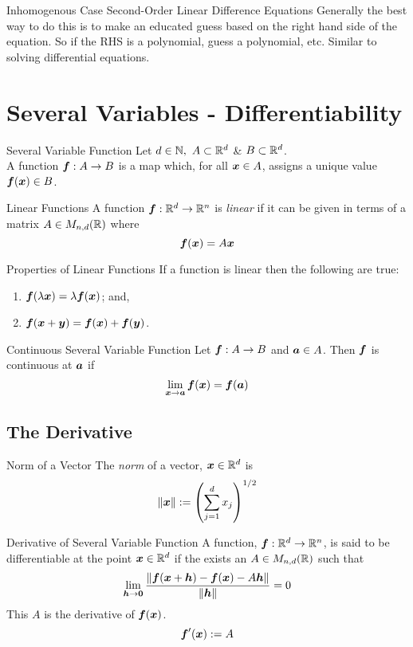 \documentclass[11pt,a4paper]{article}
\begin{document}
\subtitle{Remark 8.10 - }{Inhomogenous Case Second-Order Linear Difference Equations}
Generally the best way to do this is to make an educated guess based on the right hand side of the equation.
So if the RHS is a polynomial, guess a polynomial, etc. Similar to solving differential equations.

\section{Several Variables - Differentiability}
%
\subtitle{Definition 9.01 - }{Several Variable Function}
Let $d \in \mathbb{N},\ A \subset \mathbb{R}^d$ \& $B \subset \mathbb{R}^d$.\\
A function $\boldsymbol{f} : A \to B$ is a map which, for all $\boldsymbol{x} \in A$, assigns a unique value $\boldsymbol{f}(\boldsymbol{x}) \in B$.\\

\subtitle{Defintion 9.02 - }{Linear Functions}
A function $\boldsymbol{f} : \mathbb{R}^d \to \mathbb{R}^n$ is \textit{linear} if it can be given in terms of a matrix $A \in M_{n,d}(\mathbb{R})$ where
$$\boldsymbol{f}(\boldsymbol{x}) = A\boldsymbol{x}$$

\subtitle{Theorem 9.03 - }{Properties of Linear Functions}
If a function is linear then the following are true:
\begin{enumerate}[label=\roman*)]
  \item $\boldsymbol{f}(\lambda\boldsymbol{x}) = \lambda\boldsymbol{f}(\boldsymbol{x})$; and,
  \item $\boldsymbol{f}(\boldsymbol{x} + \boldsymbol{y}) = \boldsymbol{f}(\boldsymbol{x}) + \boldsymbol{f}(\boldsymbol{y})$.\\
\end{enumerate}

\subtitle{Definition 9.04 - }{Continuous Several Variable Function}
Let $\boldsymbol{f} : A \to B$ and $\boldsymbol{a} \in A$. Then $\boldsymbol{f}$ is continuous at $\boldsymbol{a}$ if
$$\lim_{\boldsymbol{x} \to \boldsymbol{a}}\boldsymbol{f}(\boldsymbol{x}) = \boldsymbol{f}(\boldsymbol{a})$$

\subsection{The Derivative}
%
\subtitle{Defintion 9.05 - }{Norm of a Vector}
The \textit{norm} of a vector, $\boldsymbol{x} \in \mathbb{R}^d$ is
$$\|\boldsymbol{x}\| := \left( \sum_{j=1}^{d}x_j \right)^{1/2}$$

\subtitle{Definition 9.06 - }{Derivative of Several Variable Function}
A function, $\boldsymbol{f} : \mathbb{R}^d \to \mathbb{R}^n$, is said to be differentiable at the point $\boldsymbol{x} \in \mathbb{R}^d$ if the exists an $A \in M_{n,d}(\mathbb{R})$ such that
$$\lim_{\boldsymbol{h} \to \boldsymbol{0}} \frac{\|\boldsymbol{f}(\boldsymbol{x} + \boldsymbol{h}) - \boldsymbol{f}(\boldsymbol{x}) -A\boldsymbol{h}\|}{\|\boldsymbol{h}\|} = 0$$
This $A$ is the derivative of $\boldsymbol{f}(\boldsymbol{x})$.
$$\boldsymbol{f}'(\boldsymbol{x}) := A$$
\end{document}
